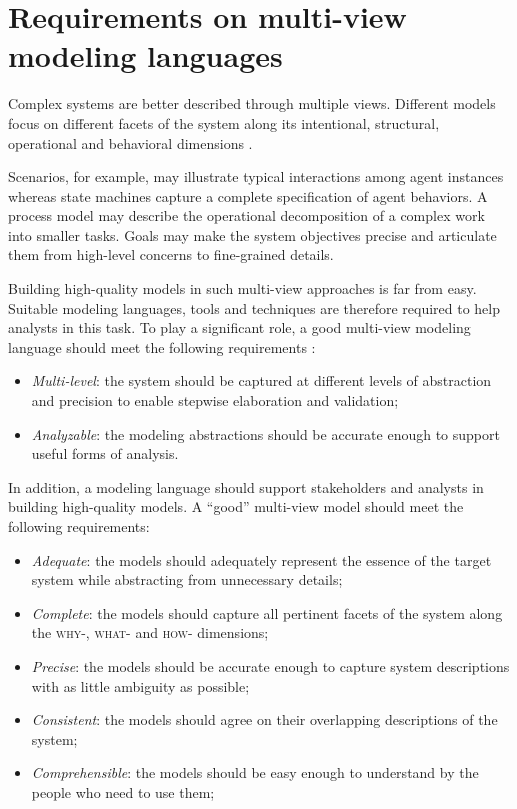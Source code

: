 \section{Requirements on multi-view modeling languages\label{section:intro-requirements}}

Complex systems are better described through multiple views. Different models focus on different facets of the system along its intentional, structural, operational and behavioral dimensions \cite{Rumbaugh:1991, Finkelstein:1992, VanLamsweerde:2009}. 

Scenarios, for example, may illustrate typical interactions among agent instances whereas state machines capture a complete specification of agent behaviors. A process model may describe the operational decomposition of a complex work into smaller tasks. Goals may make the system objectives precise and articulate them from high-level concerns to fine-grained details.

Building high-quality models in such multi-view approaches is far from easy. Suitable modeling languages, tools and techniques are therefore required to help analysts in this task. To play a significant role, a good multi-view modeling language should meet the following requirements \cite{VanLamsweerde:2009}:

\begin{itemize}
\item \emph{Multi-level}: the system should be captured at different levels of abstraction and precision to enable stepwise elaboration and validation;
\item \emph{Analyzable}: the modeling abstractions should be accurate enough to support useful forms of analysis.
\end{itemize}

In addition, a modeling language should support stakeholders and analysts in building high-quality models. A ``good'' multi-view model should meet the following requirements:

\begin{itemize}
\item \emph{Adequate}: the models should adequately represent the essence of the target system while abstracting from unnecessary details;
\item \emph{Complete}: the models should capture all pertinent facets of the system along the \textsc{why-}, \textsc{what-} and \textsc{how-} dimensions;
\item \emph{Precise}: the models should be accurate enough to capture system descriptions with as little ambiguity as possible;
\item \emph{Consistent}: the models should agree on their overlapping descriptions of the system;
\item \emph{Comprehensible}: the models should be easy enough to understand by the people who need to use them;
\end{itemize}

